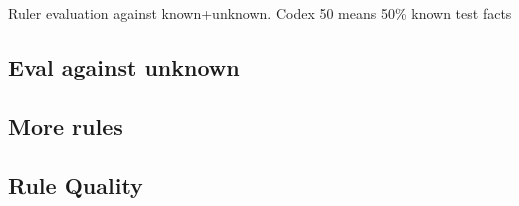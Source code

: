 
\begin{table}
    \centering
    
    \caption{Ruler evaluation against known+unknown. Codex 50 means 50\% known test facts}
    \label{tab:5_experiments/5_ruler/results}
\end{table}



\subsection{Eval against unknown}
\label{subsec:5_experiments/5_ruler/1_unknown}


\subsection{More rules}
\label{subsec:5_experiments/5_ruler/2_rule_count}


\subsection{Rule Quality}
\label{subsec:5_experiments/5_ruler/3_rule_quality}

